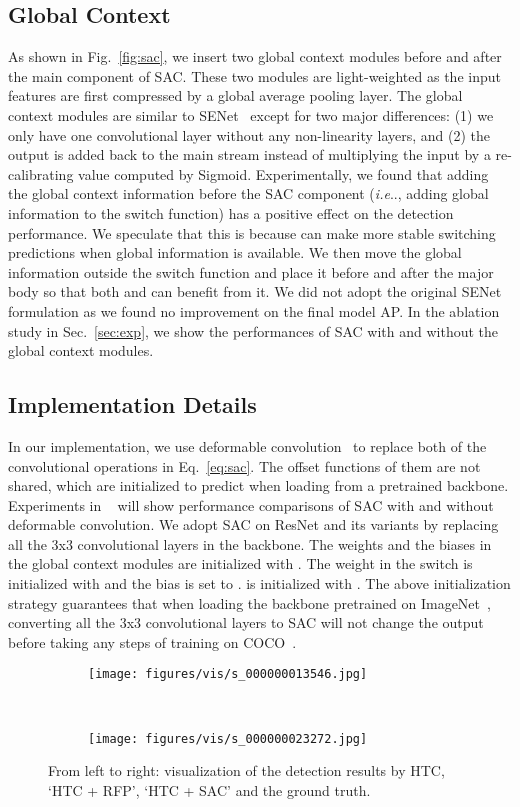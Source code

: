 \documentclass[final]{cvpr}
\makeatletter
\def\@onedot{\ifx\@let@token.\else.\null\fi\xspace}
\DeclareRobustCommand\onedot{\futurelet\@let@token\@onedot}
\def\ie{\emph{i.e}\onedot} \def\Ie{\emph{I.e}\onedot}
\makeatother
\begin{document}
\subsection{Global Context}
As shown in Fig.~\ref{fig:sac}, we insert two global context modules before and after the main component of SAC.
These two modules are light-weighted as the input features are first compressed by a global average pooling layer.
The global context modules are similar to SENet~\cite{senet} except for two major differences: (1) we only have one convolutional layer without any non-linearity layers, and (2) the output is added back to the main stream instead of multiplying the input by a re-calibrating value computed by Sigmoid.
Experimentally, we found that adding the global context information before the SAC component (\ie, adding global information to the switch function) has a positive effect on the detection performance. 
We speculate that this is because  can make more stable switching predictions when global information is available.
We then move the global information outside the switch function and place it before and after the major body so that both  and  can benefit from it.
We did not adopt the original SENet formulation as we found no improvement on the final model AP.
In the ablation study in Sec.~\ref{sec:exp}, we show the performances of SAC with and without the global context modules.

\subsection{Implementation Details}
In our implementation, we use deformable convolution~\cite{dcn,dcnv2} to replace both of the convolutional operations in Eq.~\ref{eq:sac}.
The offset functions of them are not shared, which are initialized to predict  when loading from a pretrained backbone.
Experiments in ~ will show performance comparisons of SAC with and without deformable convolution.
We adopt SAC on ResNet and its variants \cite{resnet,resnext} by replacing all the 3x3 convolutional layers in the backbone.
The weights and the biases in the global context modules are initialized with .
The weight in the switch  is initialized with  and the bias is set to .
 is initialized with .
The above initialization strategy guarantees that when loading the backbone pretrained on ImageNet~\cite{imagenet}, converting all the 3x3 convolutional layers to SAC will not change the output before taking any steps of training on COCO~\cite{coco}. \begin{figure*}
    \centering
    \begin{subfigure}[t]{\linewidth}
         \centering
         \texttt{[image: figures/vis/s\_000000013546.jpg]}
    \end{subfigure}\\
    \begin{subfigure}[t]{\linewidth}
         \centering
         \texttt{[image: figures/vis/s\_000000023272.jpg]}
    \end{subfigure}
    \caption{From left to right: visualization of the detection results by HTC, `HTC + RFP', `HTC + SAC' and the ground truth.
    }
    \label{fig:vis}
\end{figure*}
\end{document}
